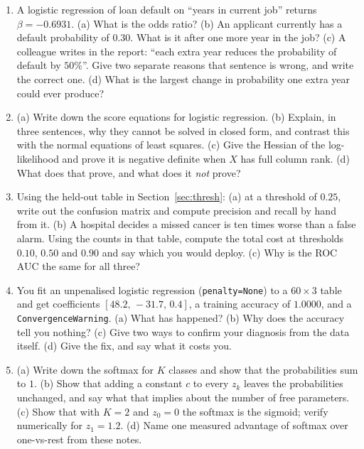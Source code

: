 \documentclass[11pt]{article}
\begin{document}
\begin{enumerate}[leftmargin=*]
  \item\label{q:or} A logistic regression of loan default on ``years in
    current job'' returns $\beta = -0.6931$. (a) What is the odds ratio?
    (b) An applicant currently has a default probability of $0.30$. What is it
    after one more year in the job? (c) A colleague writes in the report:
    ``each extra year reduces the probability of default by $50\%$''. Give two
    separate reasons that sentence is wrong, and write the correct one.
    (d) What is the largest change in probability one extra year could ever
    produce?

  \item\label{q:closed} (a) Write down the score equations for logistic
    regression. (b) Explain, in three sentences, why they cannot be solved in
    closed form, and contrast this with the normal equations of least squares.
    (c) Give the Hessian of the log-likelihood and prove it is negative
    definite when $X$ has full column rank. (d) What does that prove, and what
    does it \emph{not} prove?

  \item\label{q:thresh} Using the held-out table in Section~\ref{sec:thresh}:
    (a) at a threshold of $0.25$, write out the confusion matrix and compute
    precision and recall by hand from it. (b) A hospital decides a missed
    cancer is ten times worse than a false alarm. Using the counts in that
    table, compute the total cost at thresholds $0.10$, $0.50$ and $0.90$ and
    say which you would deploy. (c) Why is the ROC AUC the same for all three?

  \item\label{q:sep} You fit an unpenalised logistic regression
    (\texttt{penalty=None}) to a
    $60 \times 3$ table and get coefficients $[48.2,\,-31.7,\,0.4]$, a
    training accuracy of $1.0000$, and a \texttt{ConvergenceWarning}.
    (a) What has happened? (b) Why does the accuracy tell you nothing?
    (c) Give two ways to confirm your diagnosis from the data itself.
    (d) Give the fix, and say what it costs you.

  \item\label{q:softmax} (a) Write down the softmax for $K$ classes and show
    that the probabilities sum to $1$. (b) Show that adding a constant $c$ to
    every $z_k$ leaves the probabilities unchanged, and say what that implies
    about the number of free parameters. (c) Show that with $K = 2$ and
    $z_0 = 0$ the softmax is the sigmoid; verify numerically for
    $z_1 = 1.2$. (d) Name one measured advantage of softmax over one-vs-rest
    from these notes.


\end{enumerate}
\end{document}
